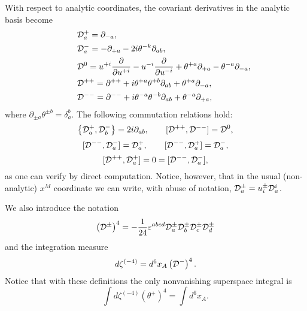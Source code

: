With respect to analytic coordinates, the covariant derivatives in the analytic basis become
\begin{align}
\label{spinor-covD-6-analytic-basis}
&	\covDs^+_a 	
 =
	\partial_{-a},
\\
%
\qquad
&	\covDs^{-}_a 	
= 
	- \partial_{+a} - 2 i \theta^{-k} \partial_{ab},
\\
%
\qquad
&	\covDs^0	
= 
	u^{+i} \frac{\partial}{\partial u^{+i}} 
	- u^{-i} \frac{\partial}{\partial u^{-i}}
	+ \theta^{+a} \partial_{+a} 
	- \theta^{-a} \partial_{-a},
%
\\
&	\covDs^{++}	
=
	\partial^{++} 
	+ i \theta^{+a} \theta^{+b} \partial_{ab} 
	+ \theta^{+a} \partial_{-a},
\\
%
\qquad
&	\covDs^{--}
=
	\partial^{--} 
	+ i \theta^{-a} \theta^{-b} \partial_{ab} 
	+ \theta^{-a} \partial_{+a},
\end{align}
where
\( \partial_{\pm a} \theta^{\pm b} = \delta^b_a. \)
The following commutation relations hold:
\begin{equation}
\left\{ { \mathcal{D} }^+_a , { \mathcal{D} }^-_b \right\} = 2i \partial_{ab},
\qquad
[ { \mathcal{D} }^{++} , { \mathcal{D} }^{--} ] = { \mathcal{D} }^0,
\end{equation}
\begin{equation}\label{casa}
[{ \mathcal{D} }^{--}, { \mathcal{D} }^-_a] = { \mathcal{D} }^+_a,
\qquad
[ { \mathcal{D} }^{--} , { \mathcal{D} }^+_a ] = { \mathcal{D} }^-_a,
\end{equation}
\begin{equation}\label{covDs++-commutator-1}
[{ \mathcal{D} }^{++} , { \mathcal{D} }^+_a ] = 0 =  [ { \mathcal{D} }^{--} , { \mathcal{D} }^-_a ],
\end{equation}
as one can verify by direct computation.
Notice, however, that in the usual (non-analytic) $x^M$ coordinate we can write, with abuse of notation, ${ \mathcal{D} }^{\pm}_a = u^{\pm}_i { \mathcal{D} }^i_a$.


We also introduce the notation
\begin{equation}
\left( { \mathcal{D} }^\pm \right)^4
	=
- \frac{1}{24}
	\varepsilon^{abcd} 
	{ \mathcal{D} }_a^\pm { \mathcal{D} }_b^\pm { \mathcal{D} }_c^\pm { \mathcal{D} }_d^\pm
\end{equation}
and the integration measure
\begin{equation}
d \zeta^{(-4)} = d^6 x_A \left( { \mathcal{D} }^- \right)^4.
\end{equation}
Notice that with these definitions the only nonvanishing superspace integral is
\begin{equation}\label{integr-zeta(-4)}
\int d \zeta^{(-4)} (\theta^+)^4 = \int d^6 x_A .
\end{equation}


